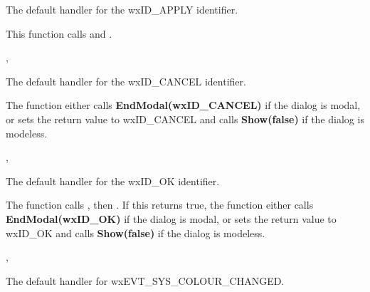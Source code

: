 The default handler for the wxID\_APPLY identifier.


This function calls  and .


, 


\label{wxdialogoncancel}


The default handler for the wxID\_CANCEL identifier.


The function either calls {\bf EndModal(wxID\_CANCEL)} if the dialog is modal, or
sets the return value to wxID\_CANCEL and calls {\bf Show(false)} if the dialog is modeless.


, 


\label{wxdialogonok}


The default handler for the wxID\_OK identifier.


The function calls
\rtfsp{}, then .
If this returns true, the function either calls {\bf EndModal(wxID\_OK)} if the dialog is modal, or
sets the return value to wxID\_OK and calls {\bf Show(false)} if the dialog is modeless.


, 


\label{wxdialogonsyscolourchanged}


The default handler for wxEVT\_SYS\_COLOUR\_CHANGED.


